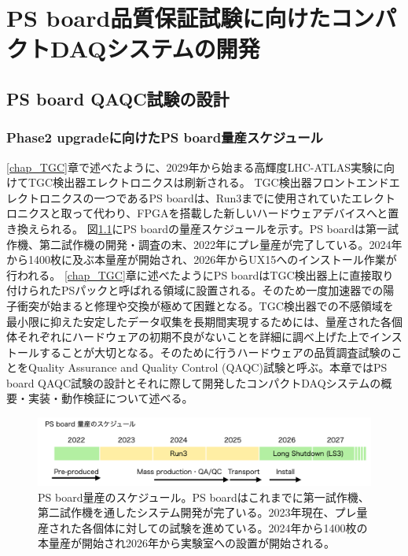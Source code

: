 \chapter{PS board品質保証試験に向けたコンパクトDAQシステムの開発}
\label{chap_QAQC}

\section{PS board QAQC試験の設計}
\label{sec_QAQCdesign}
\subsection{Phase2 upgradeに向けたPS board量産スケジュール}
\label{subsec_PSBschedule}
\ref{chap_TGC}章で述べたように、2029年から始まる高輝度LHC-ATLAS実験に向けてTGC検出器エレクトロニクスは刷新される。
TGC検出器フロントエンドエレクトロニクスの一つであるPS boardは、Run3までに使用されていたエレクトロニクスと取って代わり、FPGAを搭載した新しいハードウェアデバイスへと置き換えられる。
図\ref{PSBschedule}にPS boardの量産スケジュールを示す。PS boardは第一試作機、第二試作機の開発・調査の末、2022年にプレ量産が完了している。2024年から1400枚に及ぶ本量産が開始され、2026年からUX15へのインストール作業が行われる。
\ref{chap_TGC}章に述べたようにPS boardはTGC検出器上に直接取り付けられたPSパックと呼ばれる領域に設置される。そのため一度加速器での陽子衝突が始まると修理や交換が極めて困難となる。TGC検出器での不感領域を最小限に抑えた安定したデータ収集を長期間実現するためには、量産された各個体それぞれにハードウェアの初期不良がないことを詳細に調べ上げた上でインストールすることが大切となる。そのために行うハードウェアの品質調査試験のことをQuality Assurance and Quality Control (QAQC)試験と呼ぶ。本章ではPS board QAQC試験の設計とそれに際して開発したコンパクトDAQシステムの概要・実装・動作検証について述べる。

\begin{figure} 
\centering
\includegraphics[width=16cm]{fig/PSBschedule.png}
\caption[PS board量産のスケジュール]{PS board量産のスケジュール。PS boardはこれまでに第一試作機、第二試作機を通したシステム開発が完了いる。2023年現在、プレ量産された各個体に対しての試験を進めている。2024年から1400枚の本量産が開始され2026年から実験室への設置が開始される。}
\label{PSBschedule}
\end{figure}

